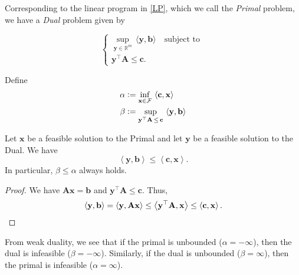 Corresponding to the linear program in \eqref{LP}, which we call the \textit{Primal} problem, we have a \textit{Dual} problem given by

\begin{equation}
    \label{dual}
    \begin{cases}
        \displaystyle\sup_{\mathbf{y} \in \mathbb{R}^m} \, \langle \mathbf{y}, \mathbf{b} \rangle \quad \text{subject to } \\
        \mathbf{y}^{\top}\mathbf{A} \leq \mathbf{c}.
    \end{cases} \tag{Dual}
\end{equation}

Define
\begin{align*}
    \alpha &\vcentcolon= \inf_{\mathbf{x} \in \mathcal{F}} \, \left\langle \mathbf{c}, \mathbf{x} \right\rangle \\
    \beta &\vcentcolon= \sup_{\mathbf{y}^{\top}\mathbf{A} \, \leq \, \mathbf{c}} \, \left\langle \mathbf{y}, \mathbf{b} \right\rangle
\end{align*}

\begin{thm}
    Let $\mathbf{x}$ be a feasible solution to the Primal and let $\mathbf{y}$ be a feasible solution to the Dual. We have
    \[
        \left\langle \mathbf{y}, \mathbf{b} \right\rangle \leq \left\langle \mathbf{c}, \mathbf{x} \right\rangle.
    \]
    In particular, $\beta \leq \alpha$ always holds. 
\end{thm}
\begin{proof}
    We have $\mathbf{Ax} = \mathbf{b}$ and $\mathbf{y}^{\top}\mathbf{A} \leq \mathbf{c}$. Thus,
    \[
        \left\langle \mathbf{y}, \mathbf{b} \right\rangle = \left\langle \mathbf{y}, \mathbf{Ax} \right\rangle \leq \left\langle \mathbf{y}^{\top}\mathbf{A}, \mathbf{x} \right\rangle \leq \left\langle \mathbf{c}, \mathbf{x} \right\rangle. \qedhere
    \]
\end{proof}

From weak duality, we see that if the primal is unbounded ($\alpha = -\infty$), then the dual is infeasible ($\beta = -\infty$). Similarly, if the dual is unbounded ($\beta = \infty$), then the primal is infeasible ($\alpha = \infty$). 

